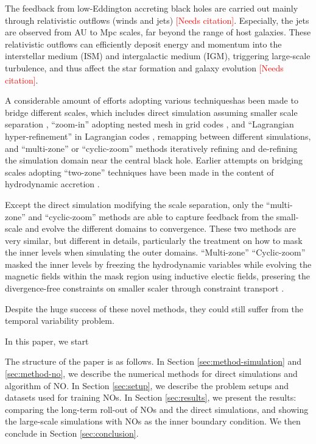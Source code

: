 \documentclass{article}
\newcommand{\red}{\textcolor{red}}
\newcommand{\AddCite}{\red{[Needs citation]}}
\newcommand{\hywcom}[1]{{\color{purple}{[HYW: #1]}}}
\begin{document}
\hywcom{Relativistic outflows.}
The feedback from low-Eddington accreting black holes are carried out mainly through relativistic outflows (winds and jets) \AddCite.
Especially, the jets are observed from AU to Mpc scales, far beyond the range of host galaxies. 
These relativistic outflows can efficiently deposit energy and momentum into the interstellar medium (ISM) and intergalactic medium (IGM), triggering large-scale turbulence, and thus affect the star formation and galaxy evolution \AddCite.

\hywcom{Black hole feeding and feedback problem.}
\hywcom{And Computational advances.}
A considerable amount of efforts adopting various techniqueshas been made to bridge different scales, 
which includes direct simulation assuming smaller scale separation \cite{Lalakos:2022qhl,Lalakos:2023ean,S:2023gta,Lalakos:2025msz},
``zoom-in'' adopting nested mesh in grid codes \cite{Guo2023,Guo2024}, and ``Lagrangian hyper-refinement'' in Lagrangian codes \cite{Hopkins:2023ipv,Hopkins2023},
remapping between different simulations, 
and ``multi-zone'' \cite{Cho:2023wqr,Cho:2024wsp,Cho:2025lzq} or ``cyclic-zoom'' \cite{Guo:2025sjb} methods iteratively 
refining and de-refining the simulation domain near the central black hole.
Earlier attempts on bridging scales adopting ``two-zone'' techniques have been made in the content of hydrodynamic accretion  \cite{Yuan:2012ApJ...761..129Y}.


\hywcom{Spatial-Temporal multiscale variability problem.}
Except the direct simulation modifying the scale separation, only the ``multi-zone'' and ``cyclic-zoom'' methods are able to capture feedback from the small-scale and evolve the different domains to convergence.
These two methods are very similar, but different in details, particularly the treatment on how to mask the inner levels when simulating the outer domains. 
``Multi-zone''
``Cyclic-zoom'' masked the inner levels by freezing the hydrodynamic variables while evolving the magnetic fields within the mask region using inductive electic fields, presering the divergence-free constraints on smaller scaler through constraint transport \cite{Balsara:1999JCoPh.149..270B,Gardiner2008}.

\hywcom{Temporal variability hierarchy.}
Despite the huge success of these novel methods, they could still suffer from the temporal variability problem.

\hywcom{Neural Operator}
In this paper, we start 

\hywcom{Paper Structure.}
The structure of the paper is as follows. 
\hywcom{multiscal-NO?}
In Section \ref{sec:method-simulation} and \ref{sec:method-no}, we describe the numerical methods for direct simulations and algorithm of NO.
In Section \ref{sec:setup}, we describe the problem setups and datasets used for training NOs.
In Section \ref{sec:results}, we present the results: comparing the long-term roll-out of NOs and the direct simulations, and showing the large-scale simulations with NOs as the inner boundary condition.
We then conclude in Section \ref{sec:conclusion}.
\end{document}
